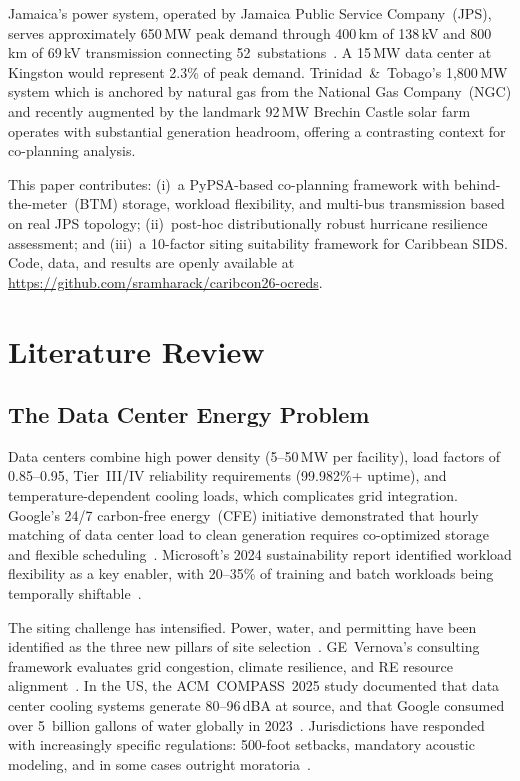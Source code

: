 \documentclass[conference,10pt]{IEEEtran}
\begin{document}
Jamaica's power system, operated by Jamaica Public Service Company~(JPS), serves approximately 650\,MW peak demand through 400\,km of 138\,kV and 800\,km of 69\,kV transmission connecting 52~substations~\cite{jps_grid}. A 15\,MW data center at Kingston would represent 2.3\% of peak demand. Trinidad~\&~Tobago's 1{,}800\,MW system which is anchored by natural gas from the National Gas Company~(NGC) and recently augmented by the landmark 92\,MW Brechin Castle solar farm~\cite{brechin2025} operates with substantial generation headroom, offering a contrasting context for co-planning analysis.

This paper contributes: (i)~a PyPSA-based co-planning framework with behind-the-meter~(BTM) storage, workload flexibility, and multi-bus transmission based on real JPS topology; (ii)~post-hoc distributionally robust hurricane resilience assessment; and (iii)~a 10-factor siting suitability framework for Caribbean SIDS. Code, data, and results are openly available at \url{https://github.com/sramharack/caribcon26-ocreds}.

\section{Literature Review}

\subsection{The Data Center Energy Problem}

Data centers combine high power density (5--50\,MW per facility), load factors of 0.85--0.95, Tier~III/IV reliability requirements (99.982\%+ uptime), and temperature-dependent cooling loads, which complicates grid integration. Google's 24/7 carbon-free energy~(CFE) initiative demonstrated that hourly matching of data center load to clean generation requires co-optimized storage and flexible scheduling~\cite{google247}. Microsoft's 2024 sustainability report identified workload flexibility as a key enabler, with 20--35\% of training and batch workloads being temporally shiftable~\cite{microsoft2024}.

The siting challenge has intensified. Power, water, and permitting have been identified as the three new pillars of site selection~\cite{dccom2025}. GE~Vernova's consulting framework evaluates grid congestion, climate resilience, and RE resource alignment~\cite{ge_vernova}. In the US, the ACM~COMPASS~2025 study documented that data center cooling systems generate 80--96\,dBA at source, and that Google consumed over 5~billion gallons of water globally in 2023~\cite{compass2025}. Jurisdictions have responded with increasingly specific regulations: 500-foot setbacks, mandatory acoustic modeling, and in some cases outright moratoria~\cite{stafford2025,albemarle2025}.
\end{document}
